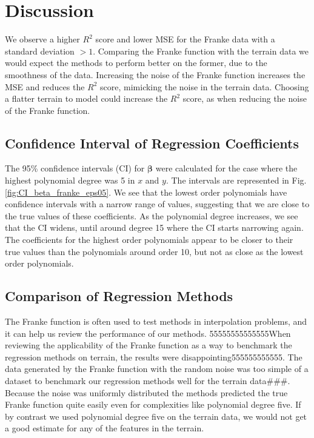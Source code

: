 \documentclass[%
 reprint,
nofootinbib,
 amsmath,amssymb,
 aps,
]{revtex4-2}
\begin{document}
\section{Discussion}\label{sec:discussion}
We observe a higher $R^2$ score and lower MSE for the Franke data with a standard deviation $> 1$. Comparing the Franke function with the terrain data we would expect the methods to perform better on the former, due to the smoothness of the data. Increasing the noise of the Franke function increases the MSE and reduces the $R^2$ score, mimicking the noise in the terrain data. Choosing a flatter terrain to model could increase the $R^2$ score, as when reducing the noise of the Franke function.

\subsection{Confidence Interval of Regression Coefficients}
The 95\% confidence intervals (CI) for $\boldsymbol{\beta}$ were calculated for the case where the highest polynomial degree was 5 in $x$ and $y$. The intervals are represented in Fig. \ref{fig:CI_beta_franke_eps05}. We see that the lowest order polynomials have confidence intervals with a narrow range of values, suggesting that we are close to the true values of these coefficients. As the polynomial degree increases, we see that the CI widens, until around degree 15 where the CI starts narrowing again. The coefficients for the highest order polynomials appear to be closer to their true values than the polynomials around order 10, but not as close as the lowest order polynomials.

\subsection{Comparison of Regression Methods}
The Franke function is often used to test methods in interpolation problems, and it can help us review the performance of our methods.
55555555555555When reviewing the applicability of the Franke function as a way to benchmark the regression methods on terrain, the results were disappointing555555555555. The data generated by the Franke function with the random noise was too simple of a dataset to benchmark our regression methods well for the terrain data###. Because the noise was uniformly distributed the methods predicted the true Franke function quite easily even for complexities like polynomial degree five. If by contrast we used polynomial degree five on the terrain data, we would not get a good estimate for any of the features in the terrain.
\end{document}

